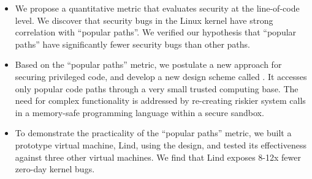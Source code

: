 \begin{itemize}\setlength\itemsep{0em}

\item
We propose a quantitative metric that evaluates security at the line-of-code level. 
We discover that security bugs in the Linux kernel have strong correlation with ``popular paths''. 
We verified our hypothesis that ``popular paths'' have significantly fewer security bugs than other paths. 

\item
Based on the ``popular paths'' metric, we postulate a new approach for securing privileged code,
and develop a new design scheme called \lip. 
It accesses only popular code paths
through a very small trusted computing base.
The need for complex functionality is addressed by re-creating riskier system calls
in a memory-safe programming language within a secure sandbox.

\item
To demonstrate the practicality of the ``popular paths'' metric, we built a prototype virtual machine, Lind, using the \lip design,
and tested its effectiveness against three other virtual machines. 
We find that Lind exposes 8-12x fewer zero-day kernel bugs. 
\end{itemize}

